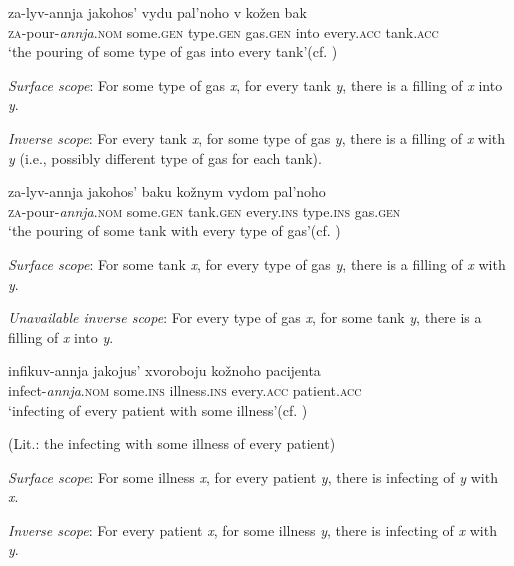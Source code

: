 \documentclass[output=paper,colorlinks,citecolor=brown]{langscibook}
\begin{document}
\ea%
    \label{ex:antonyuk:15}

\ea
\gll  za-lyv-annja     jakohos’ vydu pal’noho   v kožen bak    \\
  \textsc{za}-pour-\textit{annja}.\textsc{nom}   some.\textsc{gen}   type.\textsc{gen}   gas.\textsc{gen}  into every.\textsc{acc} tank.\textsc{acc}\\
\glt `the pouring of some type of gas into every tank’\hfill (cf. )

\textit{Surface scope}: For some type of gas \textit{x}, for every tank \textit{y}, there is a filling of \textit{x} into \textit{y}.

\textit{Inverse scope}: For every tank \textit{x}, for some type of gas \textit{y}, there is a filling of \textit{x} with \textit{y} (i.e., possibly different type of gas for each tank).

\ex
\gll    za-lyv-annja     jakohos’ baku     kožnym vydom pal’noho   \\
  \textsc{za}-pour-\textit{annja}.\textsc{nom}  some.\textsc{gen} tank.\textsc{gen}   every.\textsc{ins} type.\textsc{ins} gas.\textsc{gen}\\ 
\glt `the pouring of some tank with every type of gas’\hfill (cf. )

\textit{Surface scope}: For some tank \textit{x}, for every type of gas \textit{y}, there is a filling of \textit{x} with \textit{y}.

\textit{Unavailable inverse scope}:  For every type of gas \textit{x}, for some tank \textit{y}, there is a filling of \textit{x} into \textit{y}.
    \z
\z

\ea%
    \label{ex:antonyuk:16}

\ea
\gll   infikuv-annja     jakojus’ xvoroboju   kožnoho pacijenta     \\
infect-\textit{annja}.\textsc{nom}  some.\textsc{ins} illness.\textsc{ins}   every.\textsc{acc} patient.\textsc{acc}\\
\glt `infecting of every patient with some illness’\hfill (cf. )

  (Lit.: the infecting with some illness of every patient)

\textit{Surface scope}: For some illness \textit{x}, for every patient \textit{y}, there is infecting of \textit{y} with \textit{x}.

\textit{Inverse scope}: For every patient \textit{x}, for some illness \textit{y}, there is infecting of \textit{x} with \textit{y}.
\end{document}
